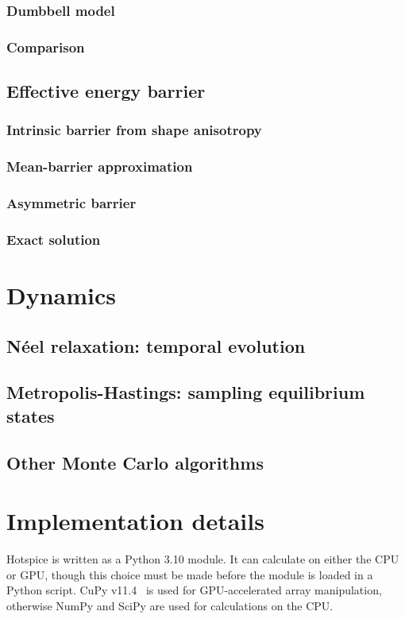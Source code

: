 \subsubsection{Dumbbell model}
\subsubsection{Comparison}
\subsection{Effective energy barrier}
\subsubsection{Intrinsic barrier from shape anisotropy}
\subsubsection{Mean-barrier approximation} %
\subsubsection{Asymmetric barrier}
\subsubsection{Exact solution} %

\section{Dynamics}
\subsection{N\'eel relaxation: temporal evolution}
\subsection{Metropolis-Hastings: sampling equilibrium states}
\subsection{Other Monte Carlo algorithms} %

\section{Implementation details}\label{sec:2:Implementation}
Hotspice is written as a Python 3.10 module.
It can calculate on either the CPU or GPU, though this choice must be made before the \hotspice module is loaded in a Python script.
CuPy v11.4~\cite{CuPy} is used for GPU-accelerated array manipulation, otherwise NumPy and SciPy are used for calculations on the CPU. \par
